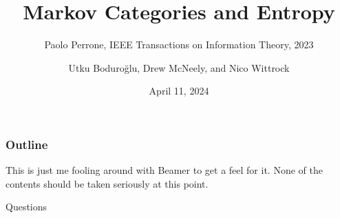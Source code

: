 \documentclass{beamer}
\title{Markov Categories and Entropy}
\subtitle{Paolo Perrone, IEEE Transactions on Information Theory, 2023}
\author{Utku Boduroğlu, Drew McNeely, and Nico Wittrock}
\institute{Adjoint School 2024}
\date{April 11, 2024}
\begin{document}
\begin{frame}
\titlepage
\end{frame}

\begin{frame}
\frametitle{Outline}
This is just me fooling around with Beamer to get a feel for it.
None of the contents should be taken seriously at this point.
\tableofcontents
\end{frame}





\begin{frame}
	Questions
\end{frame}
\end{document}
